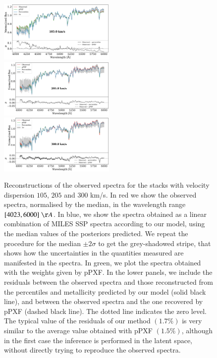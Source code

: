 \begin{figure}[h!]
    \centering
    \includegraphics[width=0.5\textwidth]{images/obs/spectra_105.0_2.pdf}
    \includegraphics[width=0.5\textwidth]{images/obs/spectra_205.0_2.pdf}
    \includegraphics[width=0.5\textwidth]{images/obs/spectra_300.0_2.pdf}
    
    
    \caption{Reconstructions of the observed spectra for the stacks with velocity dispersion $105$, $205$ and $300$ km/s. In red we show the observed spectra, normalised by the median, in the wavelength range $[4023, 6000] \; \AA$. In blue, we show the spectra obtained as a linear combination of MILES SSP spectra according to our model, using the median values of the posteriors predicted. We repeat the procedure for the median $\pm2\sigma$ to get the grey-shadowed stripe, that shows how the uncertainties in the quantities measured are manifested in the spectra. In green, we plot the spectra obtained with the weights given by pPXF. In the lower panels, we include the residuals between the observed spectra and those reconstructed from the percentiles and metallicity predicted by our model (solid black line), and between the observed spectra and the one recovered by pPXF (dashed black line). The dotted line indicates the zero level. The typical value of the residuals of our method $(1.7\%)$ is very similar to the average value obtained with pPXF $(1.5\%)$, although in the first case the inference is performed in the latent space, without directly trying to reproduce the observed spectra.}
    \label{spectra_obs}
\end{figure}





